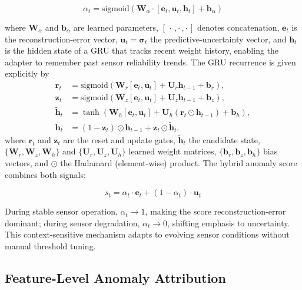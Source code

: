 \begin{equation}
\alpha_t = \text{sigmoid}(\mathbf{W}_\alpha \cdot [\mathbf{e}_t, \mathbf{u}_t, \mathbf{h}_t] + \mathbf{b}_\alpha)
\label{eq:dynamic_weight}
\end{equation}

where $\mathbf{W}_\alpha$ and $\mathbf{b}_\alpha$ are learned parameters, $[\,\cdot\,,\cdot\,,\cdot\,]$ denotes concatenation, $\mathbf{e}_t$ is the reconstruction-error vector, $\mathbf{u}_t = \boldsymbol{\sigma}_t$ the predictive-uncertainty vector, and $\mathbf{h}_t$ is the hidden state of a GRU that tracks recent weight history, enabling the adapter to remember past sensor reliability trends. The GRU recurrence is given explicitly by
\begin{align}
\mathbf{r}_t &= \mathrm{sigmoid}\!\left(\mathbf{W}_r [\mathbf{e}_t, \mathbf{u}_t] + \mathbf{U}_r \mathbf{h}_{t-1} + \mathbf{b}_r\right), \\
\mathbf{z}_t &= \mathrm{sigmoid}\!\left(\mathbf{W}_z [\mathbf{e}_t, \mathbf{u}_t] + \mathbf{U}_z \mathbf{h}_{t-1} + \mathbf{b}_z\right), \\
\tilde{\mathbf{h}}_t &= \tanh\!\left(\mathbf{W}_h [\mathbf{e}_t, \mathbf{u}_t] + \mathbf{U}_h (\mathbf{r}_t \odot \mathbf{h}_{t-1}) + \mathbf{b}_h\right), \\
\mathbf{h}_t &= (1 - \mathbf{z}_t) \odot \mathbf{h}_{t-1} + \mathbf{z}_t \odot \tilde{\mathbf{h}}_t,
\label{eq:dw_gru}
\end{align}
where $\mathbf{r}_t$ and $\mathbf{z}_t$ are the reset and update gates, $\tilde{\mathbf{h}}_t$ the candidate state, $\{\mathbf{W}_r, \mathbf{W}_z, \mathbf{W}_h\}$ and $\{\mathbf{U}_r, \mathbf{U}_z, \mathbf{U}_h\}$ learned weight matrices, $\{\mathbf{b}_r, \mathbf{b}_z, \mathbf{b}_h\}$ bias vectors, and $\odot$ the Hadamard (element-wise) product. The hybrid anomaly score combines both signals:

\begin{equation}
s_t = \alpha_t \cdot \mathbf{e}_t + (1 - \alpha_t) \cdot \mathbf{u}_t
\label{eq:hybrid_score}
\end{equation}

During stable sensor operation, $\alpha_t \to 1$, making the score reconstruction-error dominant; during sensor degradation, $\alpha_t \to 0$, shifting emphasis to uncertainty. This context-sensitive mechanism adapts to evolving sensor conditions without manual threshold tuning.

\subsection{Feature-Level Anomaly Attribution}


